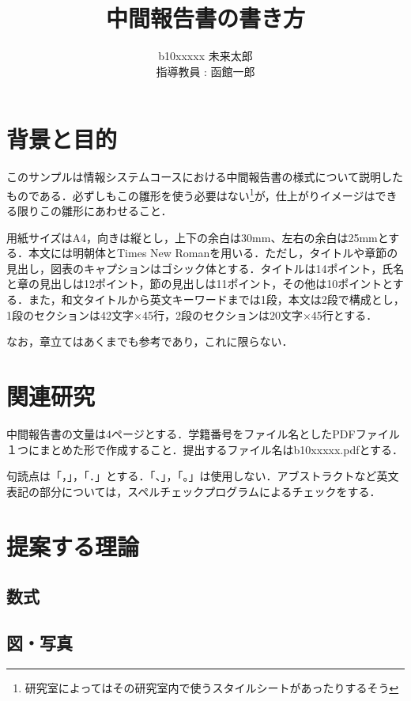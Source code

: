 \documentclass[11pt, a4paper]{jarticle}
\author{%
b10xxxxx 未来太郎\\指導教員 : 函館一郎
}
\title{中間報告書の書き方}
\begin{document}
\maketitle

\section{背景と目的}

このサンプルは情報システムコースにおける中間報告書の様式について説明したものである．必ずしもこの雛形を使う必要はない\footnote{研究室によってはその研究室内で使うスタイルシートがあったりするそう}が，仕上がりイメージはできる限りこの雛形にあわせること．

用紙サイズはA4，向きは縦とし，上下の余白は30mm、左右の余白は25mmとする．本文には明朝体とTimes New Romanを用いる．ただし，タイトルや章節の見出し，図表のキャプションはゴシック体とする．タイトルは14ポイント，氏名と章の見出しは12ポイント，節の見出しは11ポイント，その他は10ポイントとする．また，和文タイトルから英文キーワードまでは1段，本文は2段で構成とし，1段のセクションは42文字×45行，2段のセクションは20文字×45行とする．

なお，章立てはあくまでも参考であり，これに限らない．

\section{関連研究}

中間報告書の文量は4ページとする．学籍番号をファイル名としたPDFファイル１つにまとめた形で作成すること．提出するファイル名はb10xxxxx.pdfとする．

句読点は「，」，「．」とする．「、」，「。」は使用しない．アブストラクトなど英文表記の部分については，スペルチェックプログラムによるチェックをする．

\section{提案する理論}

\subsection{数式}



\subsection{図・写真}
\end{document}
